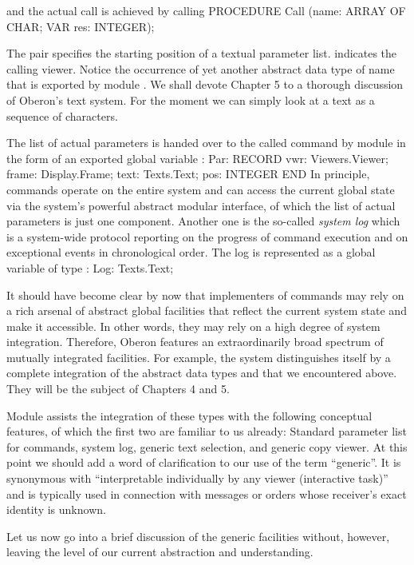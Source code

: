 \noindent and the actual call is achieved by calling
\begintt
PROCEDURE Call (name: ARRAY OF CHAR; VAR res: INTEGER);
\endtt

\noindent The pair  specifies the starting position of a textual
parameter list.  indicates the calling viewer. Notice the occurrence
of yet another abstract data type of name  that is exported by
module . We shall devote Chapter 5 to a thorough discussion of
Oberon's text system. For the moment we can simply look at a text as a
sequence of characters.

The list of actual parameters is handed over to the called command by
module  in the form of an exported global variable :
\begintt
Par: RECORD vwr: Viewers.Viewer;
       frame: Display.Frame;
       text: Texts.Text;
       pos: INTEGER
     END
\endtt
In principle, commands operate on the entire system and can access the
current global state via the system's powerful abstract modular
interface, of which the list of actual parameters is just one
component. Another one is the so-called \emph{system log} which is a
system-wide protocol reporting on the progress of command execution
and on exceptional events in chronological order. The log is
represented as a global variable of type :
\begintt
Log: Texts.Text;
\endtt

\noindent It should have become clear by now that implementers of commands may
rely on a rich arsenal of abstract global facilities that reflect the
current system state and make it accessible. In other words, they may
rely on a high degree of system integration. Therefore, Oberon
features an extraordinarily broad spectrum of mutually integrated
facilities. For example, the system distinguishes itself by a complete
integration of the abstract data types  and  that we
encountered above. They will be the subject of Chapters 4 and 5.

Module  assists the integration of these types with the
following conceptual features, of which the first two are familiar to
us already: Standard parameter list for commands, system log, generic
text selection, and generic copy viewer. At this point we should add a
word of clarification to our use of the term ``generic''. It is
synonymous with ``interpretable individually by any viewer (interactive task)''
and is typically used in connection with messages or orders
whose receiver's exact identity is unknown.

Let us now go into a brief discussion of the generic facilities
without, however, leaving the level of our current abstraction and
understanding.

